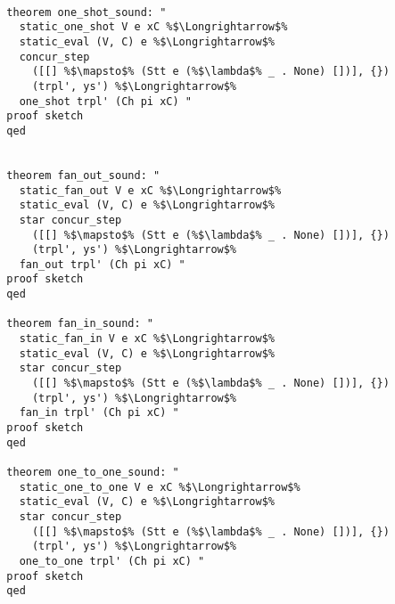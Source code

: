 \documentclass{article}
\begin{document}
\begin{lstlisting}[style=codestyle1, escapechar=\%]

  theorem one_shot_sound: "
    static_one_shot V e xC %$\Longrightarrow$%
    static_eval (V, C) e %$\Longrightarrow$%
    concur_step
      ([[] %$\mapsto$% (Stt e (%$\lambda$% _ . None) [])], {})
      (trpl', ys') %$\Longrightarrow$%
    one_shot trpl' (Ch pi xC) " 
  proof sketch
  qed


  theorem fan_out_sound: "
    static_fan_out V e xC %$\Longrightarrow$%
    static_eval (V, C) e %$\Longrightarrow$%
    star concur_step
      ([[] %$\mapsto$% (Stt e (%$\lambda$% _ . None) [])], {})
      (trpl', ys') %$\Longrightarrow$%
    fan_out trpl' (Ch pi xC) " 
  proof sketch
  qed

  theorem fan_in_sound: "
    static_fan_in V e xC %$\Longrightarrow$%
    static_eval (V, C) e %$\Longrightarrow$%
    star concur_step
      ([[] %$\mapsto$% (Stt e (%$\lambda$% _ . None) [])], {})
      (trpl', ys') %$\Longrightarrow$%
    fan_in trpl' (Ch pi xC) "
  proof sketch
  qed

  theorem one_to_one_sound: "
    static_one_to_one V e xC %$\Longrightarrow$%
    static_eval (V, C) e %$\Longrightarrow$%
    star concur_step
      ([[] %$\mapsto$% (Stt e (%$\lambda$% _ . None) [])], {})
      (trpl', ys') %$\Longrightarrow$%
    one_to_one trpl' (Ch pi xC) "
  proof sketch
  qed


  \end{lstlisting}
\begin{lstlisting}[style=codestyle1, escapechar=\%]
  \end{lstlisting}
\begin{lstlisting}[style=codestyle1, escapechar=\%]
  \end{lstlisting}
\begin{lstlisting}[style=codestyle1, escapechar=\%]
  \end{lstlisting}
\begin{lstlisting}[style=codestyle1, escapechar=\%]
  \end{lstlisting}
\end{document}
